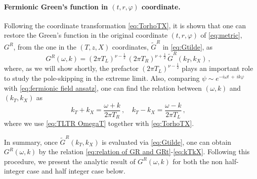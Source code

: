\documentclass[11pt,a4paper]{article}
\begin{document}
\paragraph{Fermionic Green's function in $(t,r,\varphi)$ coordinate.}
Following the coordinate transformation \eqref{eq:TorhoTX}, it is shown \cite{Iqbal:2009fd} that one can restore the Green's function in the original coordinate $(t,r,\varphi)$ of  \eqref{eq:metric}, $G^{R}$, from the one in the $(T, z, X)$ coordinates, $\tilde{G}^{R}$ in \eqref{eq:Gtilde}, as  
\begin{equation} \label{eq:relation of GR and GRt}
    G^R (\omega, k) = (2\pi T_L)^{\nu-\frac{1}{2}} \,(2\pi T_R)^{\nu+\frac{1}{2}} \,\tilde{G}^R(k_T, k_X)\,,
\end{equation}
where, as we will show shortly, the prefactor $(2\pi T_L)^{\nu-\frac{1}{2}}$ plays an important role to study the pole-skipping in the extreme limit.
%
Also, comparing $\psi \sim e^{-i \omega t \,+\, i k \varphi}$ with \eqref{eq:fermionic field ansatz}, one can find the relation between $(\omega,k)$ and $(k_T, k_X)$ as
\begin{equation}\label{eq:kTkX}
    k_T + k_X = \frac{\omega + k}{2\pi T_R}\,, \quad k_T - k_X = \frac{\omega - k}{2\pi T_L}\,,
\end{equation}
where we use \eqref{eq:TLTR OmegaT} together with \eqref{eq:TorhoTX}.

In summary, once $\tilde{G}^{R}(k_T, k_X)$ is evaluated via \eqref{eq:Gtilde}, one can obtain $G^{R}(\omega, k)$ by the relation \eqref{eq:relation of GR and GRt}-\eqref{eq:kTkX}. Following this procedure, we present the analytic result of $G^{R}(\omega, k)$ for both the non half-integer case and half integer case below. 
\end{document}
